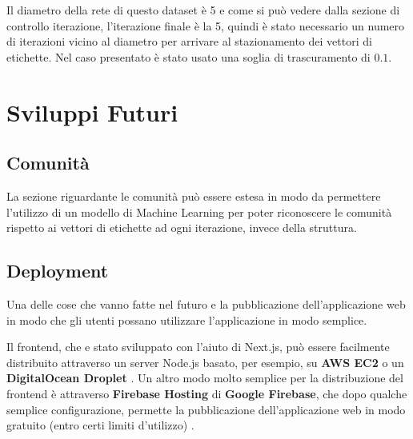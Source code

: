 \documentclass[a4paper,12pt]{report}
\begin{document}
%		
		
		Il diametro della rete di questo dataset è 5 e come si può vedere dalla sezione di controllo iterazione, l'iterazione finale è la 5, quindi è stato necessario un numero di iterazioni vicino al diametro per arrivare al stazionamento dei vettori di etichette. Nel caso presentato è stato usato una soglia di trascuramento di $0.1$.
	
\chapter{Sviluppi Futuri}

	\section{Comunità}
	
	La sezione riguardante le comunità può essere estesa in modo da permettere l'utilizzo di un modello di Machine Learning per poter riconoscere le comunità rispetto ai vettori di etichette ad ogni iterazione, invece della struttura.

	\section{Deployment}

	Una delle cose che vanno fatte nel futuro e la pubblicazione dell'applicazione web in modo che gli utenti possano utilizzare l'applicazione in modo semplice.

	Il frontend, che e stato sviluppato con l'aiuto di Next.js, può essere facilmente distribuito attraverso un server Node.js basato, per esempio, su \textbf{AWS EC2} o un \textbf{DigitalOcean Droplet} \cite{nextjsdep}. Un altro modo molto semplice per la distribuzione del frontend è attraverso \textbf{Firebase Hosting} di \textbf{Google Firebase}, che dopo qualche semplice configurazione, permette la pubblicazione dell'applicazione web in modo gratuito (entro certi limiti d'utilizzo) \cite{firebasehosting}. 
\end{document}
